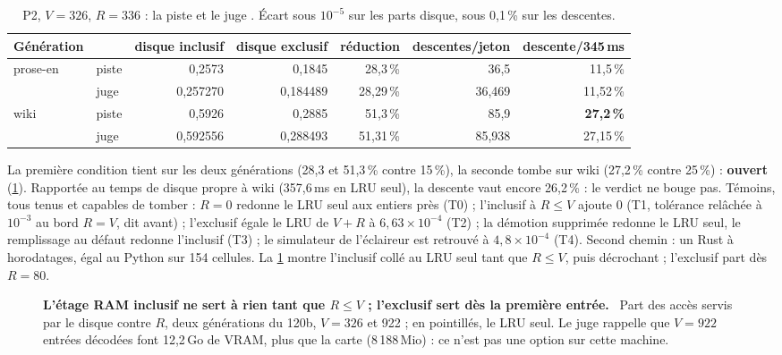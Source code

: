 \begin{table}[tbp]
\centering\small
\caption[P2 : le verdict]{P2, $V = 326$, $R = 336$ : la piste et le juge \mes. Écart sous $10^{-5}$ sur les parts disque, sous 0,1\,\% sur les descentes.}
\label{t3mim:tab:p2}
\begin{tabular}{@{}llrrrrr@{}}
\toprule
Génération & & disque inclusif & disque exclusif & réduction & descentes/jeton & descente/345\,ms \\
\midrule
prose-en & piste & 0,2573 & 0,1845 & 28,3\,\% & 36,5 & 11,5\,\% \\
 & juge & 0,257270 & 0,184489 & 28,29\,\% & 36,469 & 11,52\,\% \\
wiki & piste & 0,5926 & 0,2885 & 51,3\,\% & 85,9 & \textbf{27,2\,\%} \\
 & juge & 0,592556 & 0,288493 & 51,31\,\% & 85,938 & 27,15\,\% \\
\bottomrule
\end{tabular}
\end{table}

La première condition tient sur les deux générations (28,3 et 51,3\,\% contre 15\,\%), la seconde tombe sur wiki (27,2\,\% contre 25\,\%) : \textbf{ouvert} (\cref{t3mim:tab:p2}). Rapportée au temps de disque propre à wiki (357,6\,ms en LRU seul), la descente vaut encore 26,2\,\% : le verdict ne bouge pas. Témoins, tous tenus et capables de tomber : $R = 0$ redonne le LRU seul aux entiers près (T0) ; l'inclusif à $R \le V$ ajoute 0 (T1, tolérance relâchée à $10^{-3}$ au bord $R = V$, dit avant) ; l'exclusif égale le LRU de $V+R$ à $6{,}63 \times 10^{-4}$ (T2) ; la démotion supprimée redonne le LRU seul, le remplissage au défaut redonne l'inclusif (T3) ; le simulateur de l'éclaireur est retrouvé à $4{,}8 \times 10^{-4}$ (T4). Second chemin : un Rust à horodatages, égal au Python sur 154 cellules. La \cref{fig:t3-mim-p2-disque} montre l'inclusif collé au LRU seul tant que $R \le V$, puis décrochant ; l'exclusif part dès $R = 80$.

\begin{figure}[tbp]
\centering
{}
\caption[P2 : part disque contre la taille de la RAM]{\textbf{L'étage RAM inclusif ne sert à rien tant que $R \le V$ ; l'exclusif sert dès la première entrée.} \mes~Part des accès servis par le disque contre $R$, deux générations du 120b, $V = 326$ et 922 ; en pointillés, le LRU seul. Le juge rappelle que $V = 922$ entrées décodées font 12,2\,Go de VRAM, plus que la carte (8\,188\,Mio) : ce n'est pas une option sur cette machine. \HorsStyle{}}
\label{fig:t3-mim-p2-disque}
\end{figure}

